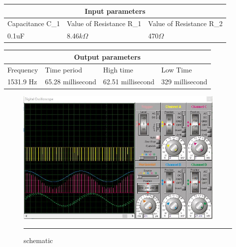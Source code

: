 \begin{center}
 \begin{tabular}{ |p{3cm}|p{3cm}|p{3cm}|  }
 	\hline
 	\multicolumn{3}{|c|}{Input parameters} \\
 	\hline
 	Capacitance C_1& Value of Resistance R_1 &Value of Resistance R_2\\
 	\hline
 	0.1uF & 8.46$k\Omega$ & 470$\Omega$\\
 	\hline
 \end{tabular}
 \end{center}
  \begin{center}
 \begin{tabular}{ |p{3cm}|p{3cm}|p{3cm}|p{3cm}| }
 	\hline
 	\multicolumn{4}{|c|}{Output parameters} \\
 	\hline
 	Frequency& Time period &High time & Low Time\\
 	\hline
 	1531.9 Hz & 65.28 millisecond & 62.51 millisecond& 329 millisecond\\
 	\hline
 \end{tabular}
 \end{center}
 	\begin{figure}[htbp]
	\centering
	\includegraphics[width = 4in]{./Figures/2.jpg}
	\rule{35em}{0.5pt}
	\caption{schematic}
\end{figure}
